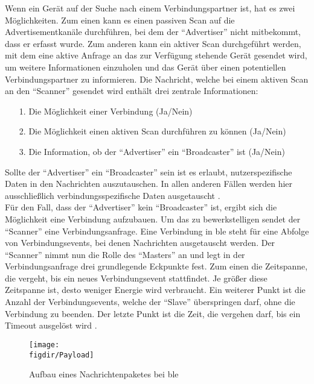 \noindent Wenn ein Gerät auf der Suche nach einem Verbindungspartner ist, hat es zwei Möglichkeiten. Zum einen kann es einen passiven Scan auf die Advertisementkanäle durchführen, bei dem der "`Advertiser"' nicht mitbekommt, dass er erfasst wurde. Zum anderen kann ein aktiver Scan durchgeführt werden, mit dem eine aktive Anfrage an das zur Verfügung stehende Gerät gesendet wird, um weitere Informationen einzuholen und das Gerät über einen potentiellen Verbindungspartner zu informieren. Die Nachricht, welche bei einem aktiven Scan an den "`Scanner"' gesendet wird enthält drei zentrale Informationen:
\begin{itemize}
	\item[1.]{Die Möglichkeit einer Verbindung (Ja/Nein)}
	\item[2.]{Die Möglichkeit einen aktiven Scan durchführen zu können (Ja/Nein)}
	\item[3.]{Die Information, ob der "`Advertiser"' ein "`Broadcaster"' ist (Ja/Nein)}
\end{itemize}           
Sollte der "`Advertiser"' ein "`Broadcaster"' sein ist es erlaubt, nutzerspezifische Daten in den Nachrichten auszutauschen. In allen anderen Fällen werden hier ausschließlich verbindungsspezifische Daten ausgetauscht \cite[Seite 20f]{Townsend14:GSB}.\\

\noindent Für den Fall, dass der "`Advertiser"' kein "`Broadcaster"' ist, ergibt sich die Möglichkeit eine Verbindung aufzubauen. Um das zu bewerkstelligen sendet der "`Scanner"' eine Verbindungsanfrage. Eine Verbindung in \ac{ble} steht für eine Abfolge von Verbindungsevents, bei denen Nachrichten ausgetauscht werden. Der "`Scanner"' nimmt nun die Rolle des "`Masters"' an und legt in der Verbindungsanfrage drei grundlegende Eckpunkte fest. Zum einen die Zeitspanne, die vergeht, bis ein neues Verbindungsevent stattfindet. Je größer diese Zeitspanne ist, desto weniger Energie wird verbraucht. Ein weiterer Punkt ist die Anzahl der Verbindungsevents, welche der "`Slave"' überspringen darf, ohne die Verbindung zu beenden. Der letzte Punkt ist die Zeit, die vergehen darf, bis ein Timeout ausgelöst wird \cite[Seite 21f]{Townsend14:GSB}.\\ 

\begin{figure}[h]
	\centering
	\texttt{[image: \\figdir/Payload]}
	\caption{Aufbau eines Nachrichtenpaketes bei \ac{ble}}
	\label{FIG:payload}
\end{figure}

